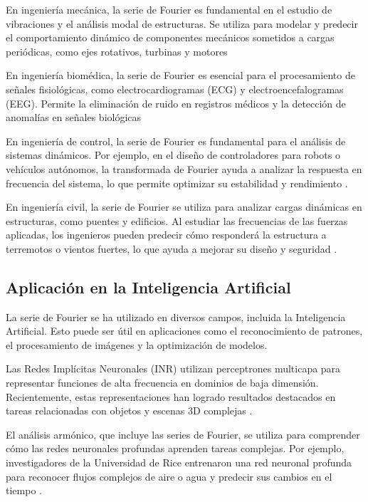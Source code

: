 {En ingeniería mecánica, la serie de Fourier es fundamental en el estudio de vibraciones y el análisis modal de estructuras. Se utiliza para modelar y predecir el comportamiento dinámico de componentes mecánicos sometidos a cargas periódicas, como ejes rotativos, turbinas y motores \cite{inman2001engineering}
\vspace{10pt}

En ingeniería biomédica, la serie de Fourier es esencial para el procesamiento de señales fisiológicas, como electrocardiogramas (ECG) y electroencefalogramas (EEG). Permite la eliminación de ruido en registros médicos y la detección de anomalías en señales biológicas \cite{metin2004biomedical}
\vspace{10pt}

En ingeniería de control, la serie de Fourier es fundamental para el análisis de sistemas dinámicos. Por ejemplo, en el diseño de controladores para robots o vehículos autónomos, la transformada de Fourier ayuda a analizar la respuesta en frecuencia del sistema, lo que permite optimizar su estabilidad y rendimiento \cite{ogata2010modern}.
\vspace{10pt}

En ingeniería civil, la serie de Fourier se utiliza para analizar cargas dinámicas en estructuras, como puentes y edificios. Al estudiar las frecuencias de las fuerzas aplicadas, los ingenieros pueden predecir cómo responderá la estructura a terremotos o vientos fuertes, lo que ayuda a mejorar su diseño y seguridad \cite{chopra2017dynamics}.


\subsection{Aplicación en la Inteligencia Artificial}

La serie de Fourier se ha utilizado en diversos campos, incluida la Inteligencia Artificial. Esto puede ser útil en aplicaciones como el reconocimiento de patrones, el procesamiento de imágenes y la optimización de modelos.
\vspace{10pt}

Las Redes Implícitas Neuronales (INR) utilizan perceptrones multicapa para representar funciones de alta frecuencia en dominios de baja dimensión. Recientemente, estas representaciones han logrado resultados destacados en tareas relacionadas con objetos y escenas 3D complejas \cite{benbarka2021seeing}.
\vspace{10pt}

El análisis armónico, que incluye las series de Fourier, se utiliza para comprender cómo las redes neuronales profundas aprenden tareas complejas. Por ejemplo, investigadores de la Universidad de Rice entrenaron una red neuronal profunda para reconocer flujos complejos de aire o agua y predecir sus cambios en el tiempo \cite{choi2023matematicas}.
\vspace{10pt}

}
